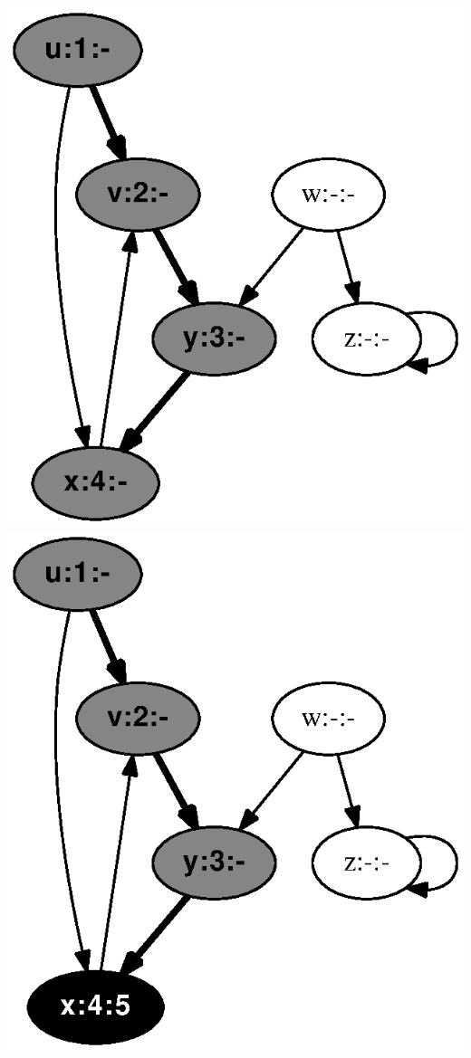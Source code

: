 \documentclass{article}
\begin{document}
\includegraphics[height=.3\textheight]{clrs_example_dfs_04.eps}
\vspace{1em}
\includegraphics[height=.3\textheight]{clrs_example_dfs_05.eps}
\end{document}
